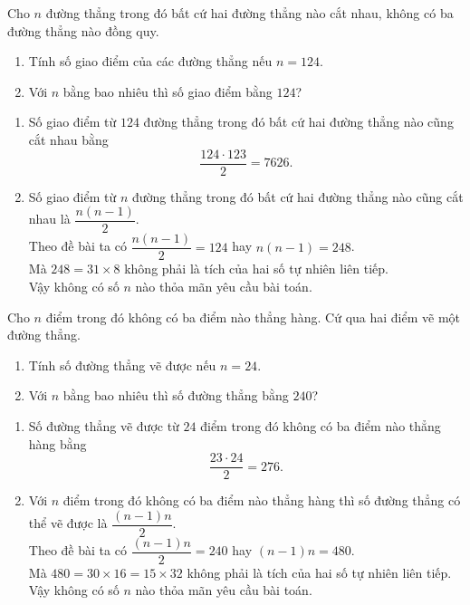 \begin{bt}%
	Cho $n$ đường thẳng trong đó bất cứ hai đường thẳng nào cắt nhau, không có ba đường thẳng nào đồng quy.
	\begin{enumerate}
		\item Tính số giao điểm của các đường thẳng nếu $n=124$.
		\item Với $n$ bằng bao nhiêu thì số giao điểm bằng $124$?
	\end{enumerate}
	\loigiai
	{
		\begin{enumerate}
			\item Số giao điểm từ $124$ đường thẳng trong đó bất cứ hai đường thẳng nào cũng cắt nhau bằng
			\[\dfrac{124 \cdot 123}{2} = 7626.\]
			\item Số giao điểm từ $n$ đường thẳng trong đó bất cứ hai đường thẳng nào cũng cắt nhau là $\dfrac{n(n-1)}{2}$.\\
			Theo đề bài ta có $\dfrac{n(n-1)}{2} = 124$ hay $n(n-1) = 248$.\\
			Mà $248 = 31 \times 8$ không phải là tích của hai số tự nhiên liên tiếp.\\
			Vậy không có số $n$ nào thỏa mãn yêu cầu bài toán.
		\end{enumerate}
	}
\end{bt}

\begin{bt}%
	Cho $n$ điểm trong đó không có ba điểm nào thẳng hàng. Cứ qua hai điểm vẽ một đường thẳng.
	\begin{enumerate}
		\item Tính số đường thẳng vẽ được nếu $n=24$.
		\item Với $n$ bằng bao nhiêu thì số đường thẳng bằng $240$?
	\end{enumerate}
	\loigiai
	{
		\begin{enumerate}
			\item Số đường thẳng vẽ được từ $24$ điểm trong đó không có ba điểm nào thẳng hàng bằng
			\[\dfrac{23 \cdot 24}{2} = 276.\]
			\item Với $n$ điểm trong đó không có ba điểm nào thẳng hàng thì số đường thẳng có thể vẽ được là $\dfrac{(n-1)n}{2}$.\\
			Theo đề bài ta có $\dfrac{(n-1)n}{2} = 240$ hay $(n-1)n=480$.\\
			Mà $480 = 30 \times 16 = 15 \times 32$ không phải là tích của hai số tự nhiên liên tiếp.\\
			Vậy không có số $n$ nào thỏa mãn yêu cầu bài toán.
		\end{enumerate}
	}
\end{bt}

